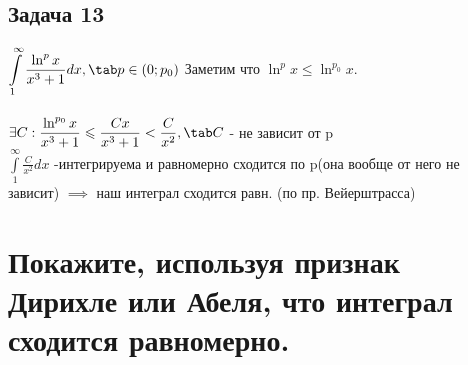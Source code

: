 \documentclass[a4paper, fleqn]{article}
\newcommand\ds{\displaystyle}
\begin{document}

\subsection*{Задача 13}
$\ds\int\limits_1^\infty \frac{\ln^px}{x^3+1} dx, \tab p \in (0; p_0)\\$
Заметим что $\ds\ln^px \leq \ln^{p_0}x$.\\\\
$\ds\exists C: \frac{\ln^{p_0} x}{x^3+1} \leq  \frac{Cx}{x^3+1} <  \frac{C}{x^2}, \tab C$ - не зависит от p \\
$\ds\int\limits_1^\infty \frac{C}{x^2} dx$ -интегрируема и равномерно сходится по p(она вообще от него не зависит) $\implies$ наш интеграл сходится равн. (по пр. Вейерштрасса)

\section*{Покажите, используя признак Дирихле или Абеля, что интеграл сходится равномерно.}





\end{document}
